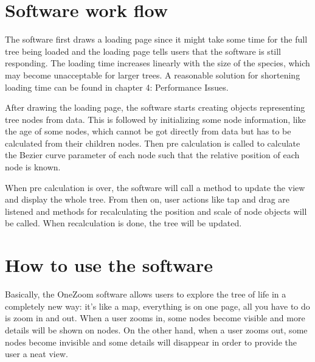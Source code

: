 \documentclass[a4paper,11pt,twoside]{report}
\begin{document}
\section{Software work flow}

The software first draws a loading page since it might take some time for the full tree being loaded and the loading page tells users that the software is still responding. The loading time increases linearly with the size of the species, which may become unacceptable for larger trees. A reasonable solution for shortening loading time can be found in chapter 4: Performance Issues. 

After drawing the loading page, the software starts creating objects representing tree nodes from data. This is followed by initializing some node information, like the age of some nodes, which cannot be got directly from data but has to be calculated from their children nodes. Then pre calculation is called to calculate the Bezier curve parameter of each node such that the relative position of each node is known. 

When pre calculation is over, the software will call a method to update the view and display the whole tree. From then on, user actions like tap and drag are listened and methods for recalculating the position and scale of node objects will be called. When recalculation is done, the tree will be updated. 



\section{How to use the software}
Basically, the OneZoom software allows users to explore the tree of life in a completely new way: it's like a map, everything is on one page, all you have to do is zoom in and out. When a user zooms in, some nodes become visible and more details will be shown on nodes. On the other hand, when a user zooms out, some nodes become invisible and some details will disappear in order to provide the user a neat view. 
\end{document}
